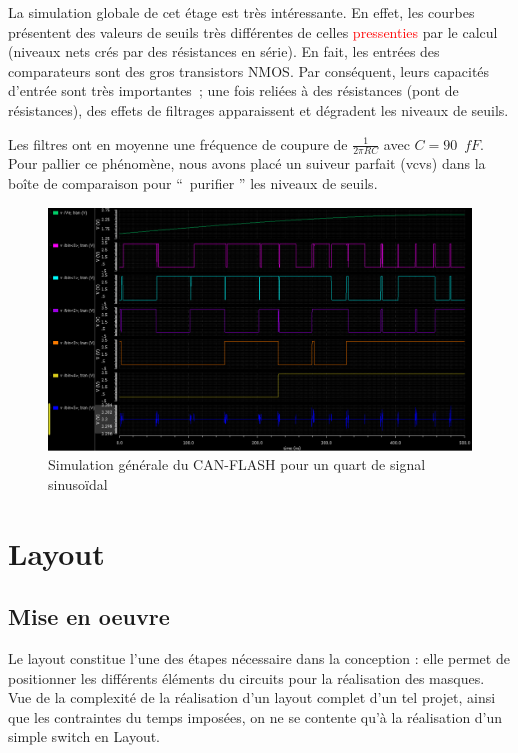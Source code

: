 \documentclass[11pt]{article}
\begin{document}
La simulation globale de cet \'etage est tr\`es int\'eressante. En effet, les courbes pr\'esentent des valeurs de
seuils tr\`es diff\'erentes de celles \textcolor{red}{pressenties} par le calcul (niveaux nets cr\'es par des r\'esistances en s\'erie).
En fait, les entr\'ees des comparateurs sont des gros transistors NMOS. Par cons\'equent, leurs capacit\'es d'entr\'ee
sont tr\`es importantes ; une fois reli\'ees \`a des r\'esistances (pont de r\'esistances), des effets de filtrages
apparaissent et d\'egradent les niveaux de seuils.

Les filtres ont en moyenne une fr\'equence de coupure de $\frac{1}{2 \pi R C}$ avec $C  = 90 \phantom{2} fF.$
Pour pallier ce ph\'enom\`ene, nous avons plac\'e un suiveur parfait (vcvs) dans la bo\^ite de comparaison pour
`` purifier '' les niveaux de seuils.

\begin{figure}[!htb]
      \centering
      \includegraphics[width=\linewidth]{sim_general.png}
      \caption{Simulation g\'en\'erale du CAN-FLASH pour un quart de signal sinuso\"idal}
      \label{fig:schsimgenerale}
\end{figure}%

\clearpage

\section{Layout}
\subsection{Mise en oeuvre}

Le layout constitue l'une des \'etapes n\'ecessaire dans la conception : elle permet de positionner
les diff\'erents \'el\'ements du circuits pour la r\'ealisation des masques.
Vue de la complexit\'e de la r\'ealisation d'un layout complet d'un tel projet, ainsi que les contraintes
du temps impos\'ees, on ne se contente qu'\`a la r\'ealisation d'un simple switch en Layout.
\end{document}
